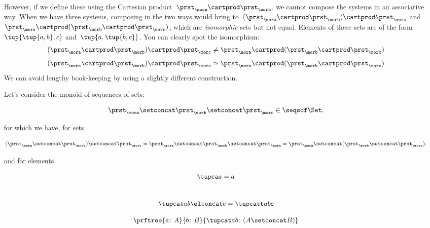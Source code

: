 However, if we define these using the Cartesian product~$\prst_{\mora} \cartprod \prst_{\morb}$, we cannot compose the systems in an associative way.
When we have three systems, composing in the two ways would bring to~$(\prst_{\mora} \cartprod \prst_{\morb}) \cartprod \prst_{\morc}$ and~$\prst_{\mora} \cartprod (\prst_{\morb} \cartprod \prst_{\morc})$, which are \emph{isomorphic} sets but not equal.
Elements of these sets are of the form~$\tup{\tup{a,b},c}$ and~$\tup{a, \tup{b,c}}$. You can clearly spot the isomorphism:
\begin{equation}\label{eq:assoc-fails1}
(\prst_{\mora} \cartprod \prst_{\morb}) \cartprod \prst_{\morc} \neq \prst_{\mora} \cartprod (\prst_{\morb} \cartprod \prst_{\morc})
\end{equation}
\begin{equation}\label{eq:assoc-fails2}
  (\prst_{\mora} \cartprod \prst_{\morb}) \cartprod \prst_{\morc} \simeq \prst_{\mora} \cartprod (\prst_{\morb} \cartprod \prst_{\morc})
  \end{equation}
We can avoid lengthy book-keeping by using a slightly different construction.

Let's consider the monoid of sequences of sets:

\begin{equation}\label{eq:sets-monoid}
\prst_{\mora} \setconcat \prst_{\morb} \setconcat \prst_{\morc} \in \seqsof\Set,
\end{equation}

for which we have, for sets

\begin{equation}\label{eq:sets-monoid-comp}
  (\prst_{\mora} \setconcat \prst_{\morb} )\setconcat \prst_{\morc} =
  \prst_{\mora} \setconcat \prst_{\morb} \setconcat \prst_{\morc} =
  \prst_{\mora} \setconcat (\prst_{\morb} \setconcat \prst_{\morc}),
\end{equation}

and for elements

\begin{equation}
  \tupca a   = a
\end{equation}
~
\begin{equation}\label{eq:sets-monoid-el-cat}
   \tupcat a b \elconcat c = \tupcatt a b c
\end{equation}

\begin{equation}\label{eq:sets-monoid-axiom1}
  \prftree{a \colon A}{b \colon B}{ \tupcat a b \colon (A \setconcat B) }
\end{equation}

